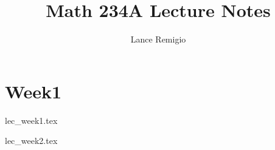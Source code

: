 \documentclass[a4paper]{report}
\title{Math 234A Lecture Notes}
\author{Lance Remigio}
\begin{document}
\maketitle    

\chapter{Week1}

{lec_week1.tex}

{lec_week2.tex}
\end{document}
